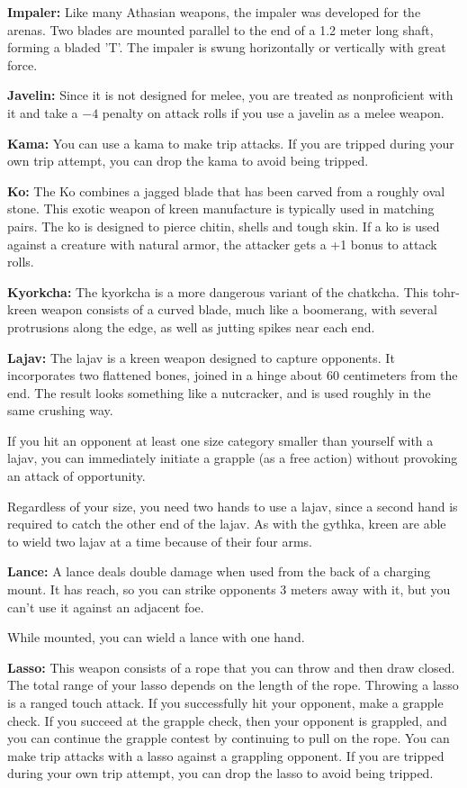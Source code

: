 \textbf{Impaler:} Like many Athasian weapons, the impaler was developed for the arenas. Two blades are mounted parallel to the end of a 1.2 meter long shaft, forming a bladed 'T'. The impaler is swung horizontally or vertically with great force.

\textbf{Javelin:} Since it is not designed for melee, you are treated as nonproficient with it and take a $-4$ penalty on attack rolls if you use a javelin as a melee weapon. 

\textbf{Kama:} You can use a kama to make trip attacks. If you are tripped during your own trip attempt, you can drop the kama to avoid being tripped. 

\textbf{Ko:} The Ko combines a jagged blade that has been carved from a roughly oval stone. This exotic weapon of kreen manufacture is typically used in matching pairs. The ko is designed to pierce chitin, shells and tough skin. If a ko is used against a creature with natural armor, the attacker gets a +1 bonus to attack rolls.

\textbf{Kyorkcha:} The kyorkcha is a more dangerous variant of the chatkcha. This tohr-kreen weapon consists of a curved blade, much like a boomerang, with several protrusions along the edge, as well as jutting spikes near each end.

\textbf{Lajav:} The lajav is a kreen weapon designed to capture opponents. It incorporates two flattened bones, joined in a hinge about 60 centimeters from the end. The result looks something like a nutcracker, and is used roughly in the same crushing way.

If you hit an opponent at least one size category smaller than yourself with a lajav, you can immediately initiate a grapple (as a free action) without provoking an attack of opportunity.

Regardless of your size, you need two hands to use a lajav, since a second hand is required to catch the other end of the lajav. As with the gythka, kreen are able to wield two lajav at a time because of their four arms.

\textbf{Lance:} A lance deals double damage when used from the back of a charging mount. It has reach, so you can strike opponents 3 meters away with it, but you can't use it against an adjacent foe.

While mounted, you can wield a lance with one hand. 

\textbf{Lasso:} This weapon consists of a rope that you can throw and then draw closed. The total range of your lasso depends on the length of the rope. Throwing a lasso is a ranged touch attack. If you successfully hit your opponent, make a grapple check. If you succeed at the grapple check, then your opponent is grappled, and you can continue the grapple contest by continuing to pull on the rope. You can make trip attacks with a lasso against a grappling opponent. If you are tripped during your own trip attempt, you can drop the lasso to avoid being tripped.

